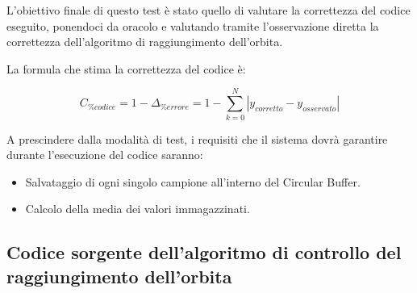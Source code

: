 \documentclass[LaM,binding=0.6cm]{../sapthesis}
\begin{document}
L'obiettivo finale di questo test è stato quello di valutare la correttezza del codice eseguito, ponendoci da oracolo e valutando tramite l'osservazione diretta la correttezza dell'algoritmo di raggiungimento dell'orbita.

La formula che stima la correttezza del codice è:

\begin{equation}
     C_{\% codice}  = 1 - \Delta_{\% errore} = 1 - \sum_{k=0}^{N} | y_{corretto} - y_{osservato} |
\end{equation}

A prescindere dalla modalità di test, i requisiti che il sistema dovrà garantire durante l'esecuzione del codice saranno:
\begin{itemize}
    \item Salvataggio di ogni singolo campione all'interno del Circular Buffer.
    
    \item Calcolo della media dei valori immagazzinati.
    
\end{itemize}


\subsection{Codice sorgente dell'algoritmo di controllo del raggiungimento dell'orbita}
\end{document}
